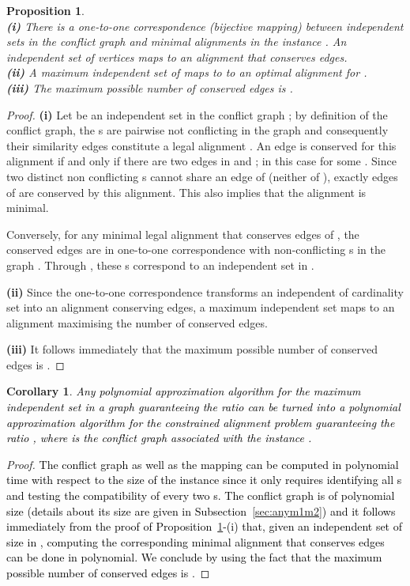 \documentclass[final]{dmtcs-episciences}
\newtheorem{corollary}[theorem]{Corollary}
\newtheorem{proposition}[theorem]{Proposition}
\newcommand\mar[1]{\textcolor{black}{#1}}
\begin{document}
\begin{proposition}\label{prop:reduction_alpha}\mbox{}\\
{\bf{(i)}} There is a one-to-one correspondence (bijective mapping) between independent sets in the conflict graph and minimal alignments in the instance . An independent set of  vertices maps to an alignment that conserves  edges.\\
  {\bf{(ii)}} A maximum independent set of  maps to to an optimal alignment for .\\
   {\bf{(iii)}} The maximum possible number of conserved edges is .
\end{proposition}
\begin{proof}
\textbf{(i)}
 Let  be an independent  set in the conflict graph ; by definition of the conflict graph, the s  are pairwise not conflicting in the graph  and consequently their similarity edges constitute a legal alignment . An edge  is conserved for this alignment if and only if there are two edges  in  and ; in this case  for some .  Since two distinct non conflicting s cannot share an edge of  (neither of ), exactly  edges of  are conserved by this alignment. This also implies that the alignment  is minimal.
 
 Conversely, for any minimal legal alignment that conserves  edges of , the conserved edges are in one-to-one correspondence with non-conflicting s in the graph . Through , these s correspond to an independent set  in .
 
 \textbf{(ii)} Since the one-to-one correspondence transforms an independent of cardinality  set into  an alignment conserving  edges, a maximum independent set maps to an alignment maximising the number of conserved edges.
 
 
 \textbf{(iii)} It follows immediately that the maximum possible number of conserved edges is .
 
\end{proof}



\begin{corollary}\label{cor:reduction}
\mar{Any polynomial approximation algorithm for the maximum independent set in a graph   guaranteeing the ratio   can be turned into a  polynomial approximation algorithm for the constrained alignment problem guaranteeing the ratio , where  is the conflict graph associated with the instance .}
\end{corollary}

\begin{proof}
\mar{The conflict graph as well as the mapping   can be computed in polynomial time with respect to the size  of the instance   since it only requires identifying all s and testing the compatibility of every two s. The conflict graph is of polynomial size (details about its size are given in Subsection~\ref{sec:anym1m2}) and it follows immediately from the proof of Proposition~\ref{prop:reduction_alpha}-(i) that, given an independent set of size  in , computing the corresponding minimal alignment that conserves  edges can be done in polynomial. We conclude by using the fact that the maximum possible number of conserved edges is .}
\end{proof}
\end{document}
